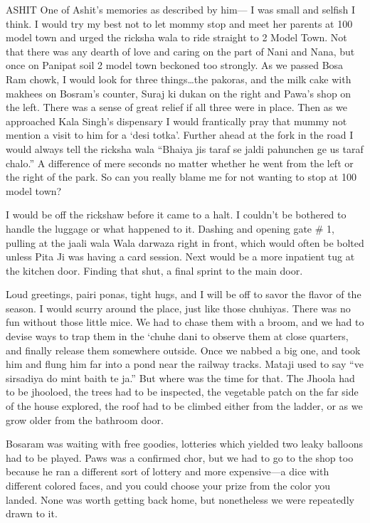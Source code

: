 ASHIT 
One of Ashit’s memories as described by him—
I was small and selfish I think. I would try my best not to let mommy stop and meet her parents at 100 model town and urged the ricksha wala to ride straight to 2 Model Town. Not that there was any dearth of love and caring on the part of Nani and Nana, but once on Panipat soil 2 model town beckoned too strongly. As we passed Bosa Ram chowk, I would look for three things…the pakoras, and the milk cake with makhees on Bosram’s counter, Suraj ki dukan on the right and Pawa’s shop on the left. There was a sense of great relief if all three were in place. Then as we approached Kala Singh’s dispensary I would frantically pray that mummy not mention a visit to him for a ‘desi totka’. Further ahead at the fork in the road I would always tell the ricksha wala “Bhaiya jis taraf se jaldi pahunchen ge us taraf chalo.” A difference of mere seconds no matter whether he went from the left or the right of the park. So can you really blame me for not wanting to stop at 100 model town? 

I would be off the rickshaw before it came to a halt. I couldn’t be bothered to handle the luggage or what happened to it. Dashing and opening gate # 1, pulling at the jaali wala Wala darwaza right in front, which would often be bolted unless Pita Ji was having a card session. Next would be a more inpatient tug at the kitchen door. Finding that shut, a final sprint to the main door.

Loud greetings, pairi ponas, tight hugs, and I will be off to savor the flavor of the season. I would scurry around the place, just like those chuhiyas. There was no fun without those little mice. We had to chase them with a broom, and we had to devise ways to trap them in the ‘chuhe dani to observe them at close quarters, and finally release them somewhere outside. Once we nabbed a big one, and took him and flung him far into a pond near the railway tracks.
Mataji used to say “ve sirsadiya do mint baith te ja.” But where was the time for that. The Jhoola had to be jhooloed, the trees had to be inspected, the vegetable patch on the far side of the house explored, the roof had to be climbed either from the ladder, or as we grow older from the bathroom door. 

Bosaram was waiting with free goodies, lotteries which yielded two leaky balloons had to be played. Paws was a confirmed chor, but we had to go to the shop too because he ran a different sort of lottery and more expensive—a dice with different colored faces, and you could choose your prize from the color you landed. None was worth getting back home, but nonetheless we were repeatedly drawn to it. 

